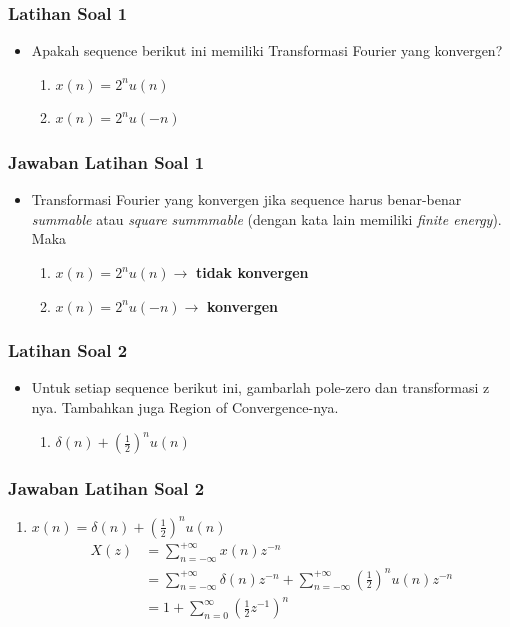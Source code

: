 \documentclass[pdflatex,compress,mathserif]{beamer}
\begin{document}
\begin{frame}
	\frametitle{Latihan Soal 1}
	\begin{itemize}
		\item Apakah sequence berikut ini memiliki Transformasi Fourier yang konvergen?
		\begin{enumerate}
			\item $ x(n) = 2^n u(n) $
			\item $ x(n) = 2^n u(-n) $
		\end{enumerate}
	\end{itemize}
\end{frame}

\begin{frame}
	\frametitle{Jawaban Latihan Soal 1}
	\begin{itemize}
		\item Transformasi Fourier yang konvergen jika sequence harus benar-benar \textit{summable} atau \textit{square summmable} (dengan kata lain memiliki \textit{finite energy}). Maka
		\begin{enumerate}
			\item $ x(n) = 2^n u(n) \rightarrow $ \textbf{tidak konvergen}
			\item $ x(n) = 2^n u(-n) \rightarrow $ \textbf{konvergen}
		\end{enumerate}
	\end{itemize}
\end{frame}

\begin{frame}
	\frametitle{Latihan Soal 2}
	\begin{itemize}
		\item Untuk setiap sequence berikut ini, gambarlah pole-zero dan transformasi z nya. Tambahkan juga Region of Convergence-nya.
		\begin{enumerate}
			\item $ \delta(n) + \left( \frac{1}{2} \right)^n u(n) $
		\end{enumerate}
	\end{itemize}
\end{frame}

\begin{frame}
	\frametitle{Jawaban Latihan Soal 2}
	\begin{enumerate}
		\item $ x(n) = \delta(n) + \left( \frac{1}{2} \right)^n u(n) $
		\begin{align*}
			X(z) &= \sum_{n = -\infty}^{+\infty} x(n)z^{-n} \\
			&= \sum_{n = -\infty}^{+\infty} \delta(n) z^{-n} + \sum_{n = -\infty}^{+\infty} \left(\frac{1}{2}\right)^n u(n) z^{-n} \\
			&= 1 + \sum_{n=0}^{\infty} \left(\frac{1}{2}z^{-1}\right)^n \\
		\end{align*}
	\end{enumerate}
\end{frame}
\end{document}
